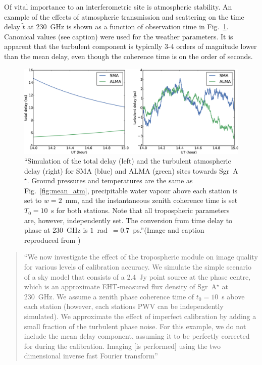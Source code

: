 Of vital importance to an interferometric site is atmospheric stability. An example of the effects of atmospheric transmission and scattering on the time delay $\tilde{t}$ at 230~GHz is shown as a function of observation time in Fig.~\ref{delay_plots}. Canonical values (see caption) were used for the weather parameters. It is apparent that the turbulent component is typically 3-4 orders of magnitude lower than the mean delay, even though the coherence time is on the order of seconds.


\begin{figure}[h!]
\includegraphics[width=\columnwidth]{Images/delays}
\caption{``Simulation of the total delay (left) and the turbulent atmospheric delay (right) for SMA (blue) and ALMA (green) sites towards Sgr~A$^\star$. Ground pressures and temperatures are the same as Fig.~\ref{fig:mean_atm}, precipitable water vapour above each station is set to $w=2$~mm, and the instantaneous zenith coherence time is set $T_0=10$~s for both stations. Note that all tropospheric parameters are, however, independently set. The conversion from time delay to phase at 230~GHz is $1$~rad~$=0.7$~ps.''(Image and caption reproduced from \citet{Blecher_2016})\label{delay_plots}%
}
\end{figure}



\begin{quotation}
``We now investigate the effect of the tropospheric module on image quality for various levels of calibration accuracy. We simulate the simple scenario of a sky model that consists of a 2.4~Jy point source at the phase centre, which is an approximate EHT-measured flux density of Sgr~A$^\star$ at 230~GHz. We assume a zenith phase coherence time of $t_0=10$~s above each station (however, each stations PWV can be independently simulated). We approximate the effect of imperfect calibration by adding a small fraction of the turbulent phase noise. For this example, we do not include the mean delay component, assuming it to be perfectly corrected for during the calibration. Imaging [is performed] using the two dimensional inverse fast Fourier transform''\\
\citep{Blecher_2016}
\end{quotation}

